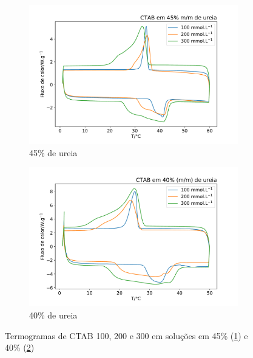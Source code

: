 	\begin{figure}[H]
		\begin{subfigure}[t]{0.45\textwidth}
			\centering
			\includegraphics[width=\textwidth]{./imagens/dsc/CTAB_45p}
			\caption{45\% de ureia}
			\label{fig:DSC_CTAB_UR45}
		\end{subfigure} \qquad %
		\begin{subfigure}[t]{0.45\textwidth}
			\centering
			\includegraphics[width=\textwidth]{./imagens/dsc/CTAB_40p}
			\caption{40\% de ureia}
			\label{fig:DSC_CTAB_UR40}
		\end{subfigure}
		\caption{Termogramas de CTAB 100, 200 e 300 \mM{} em soluções em 45\% (\ref{fig:DSC_CTAB_UR45}) e 40\% (\ref{fig:DSC_CTAB_UR40})}
		\label{fig:DSC_CTAB_UR40-45}
	\end{figure}

